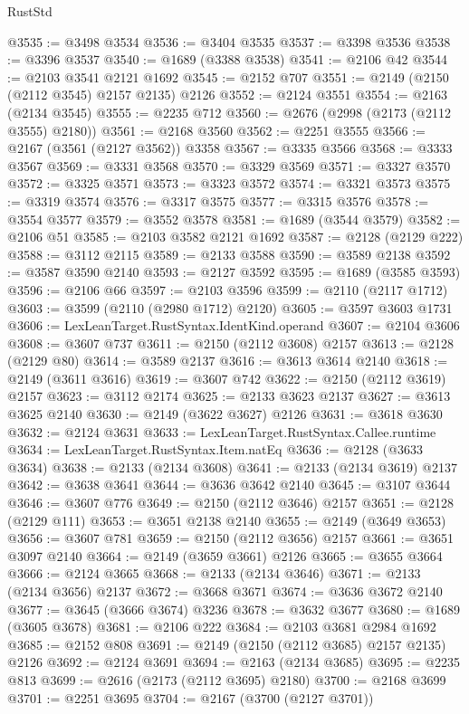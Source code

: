 \begin{lexlean}{RustStd}
\begin{coremodule}
@3535 := @3498 @3534
@3536 := @3404 @3535
@3537 := @3398 @3536
@3538 := @3396 @3537
@3540 := @1689 (@3388 @3538)
@3541 := @2106 @42
@3544 := @2103 @3541 @2121 @1692
@3545 := @2152 @707
@3551 := @2149 (@2150 (@2112 @3545) @2157 @2135) @2126
@3552 := @2124 @3551
@3554 := @2163 (@2134 @3545)
@3555 := @2235 @712
@3560 := @2676 (@2998 (@2173 (@2112 @3555) @2180))
@3561 := @2168 @3560
@3562 := @2251 @3555
@3566 := @2167 (@3561 (@2127 @3562)) @3358
@3567 := @3335 @3566
@3568 := @3333 @3567
@3569 := @3331 @3568
@3570 := @3329 @3569
@3571 := @3327 @3570
@3572 := @3325 @3571
@3573 := @3323 @3572
@3574 := @3321 @3573
@3575 := @3319 @3574
@3576 := @3317 @3575
@3577 := @3315 @3576
@3578 := @3554 @3577
@3579 := @3552 @3578
@3581 := @1689 (@3544 @3579)
@3582 := @2106 @51
@3585 := @2103 @3582 @2121 @1692
@3587 := @2128 (@2129 @222)
@3588 := @3112 @2115
@3589 := @2133 @3588
@3590 := @3589 @2138
@3592 := @3587 @3590 @2140
@3593 := @2127 @3592
@3595 := @1689 (@3585 @3593)
@3596 := @2106 @66
@3597 := @2103 @3596
@3599 := @2110 (@2117 @1712)
@3603 := @3599 (@2110 (@2980 @1712) @2120)
@3605 := @3597 @3603 @1731
@3606 := LexLeanTarget.RustSyntax.IdentKind.operand
@3607 := @2104 @3606
@3608 := @3607 @737
@3611 := @2150 (@2112 @3608) @2157
@3613 := @2128 (@2129 @80)
@3614 := @3589 @2137
@3616 := @3613 @3614 @2140
@3618 := @2149 (@3611 @3616)
@3619 := @3607 @742
@3622 := @2150 (@2112 @3619) @2157
@3623 := @3112 @2174
@3625 := @2133 @3623 @2137
@3627 := @3613 @3625 @2140
@3630 := @2149 (@3622 @3627) @2126
@3631 := @3618 @3630
@3632 := @2124 @3631
@3633 := LexLeanTarget.RustSyntax.Callee.runtime
@3634 := LexLeanTarget.RustSyntax.Item.natEq
@3636 := @2128 (@3633 @3634)
@3638 := @2133 (@2134 @3608)
@3641 := @2133 (@2134 @3619) @2137
@3642 := @3638 @3641
@3644 := @3636 @3642 @2140
@3645 := @3107 @3644
@3646 := @3607 @776
@3649 := @2150 (@2112 @3646) @2157
@3651 := @2128 (@2129 @111)
@3653 := @3651 @2138 @2140
@3655 := @2149 (@3649 @3653)
@3656 := @3607 @781
@3659 := @2150 (@2112 @3656) @2157
@3661 := @3651 @3097 @2140
@3664 := @2149 (@3659 @3661) @2126
@3665 := @3655 @3664
@3666 := @2124 @3665
@3668 := @2133 (@2134 @3646)
@3671 := @2133 (@2134 @3656) @2137
@3672 := @3668 @3671
@3674 := @3636 @3672 @2140
@3677 := @3645 (@3666 @3674) @3236
@3678 := @3632 @3677
@3680 := @1689 (@3605 @3678)
@3681 := @2106 @222
@3684 := @2103 @3681 @2984 @1692
@3685 := @2152 @808
@3691 := @2149 (@2150 (@2112 @3685) @2157 @2135) @2126
@3692 := @2124 @3691
@3694 := @2163 (@2134 @3685)
@3695 := @2235 @813
@3699 := @2616 (@2173 (@2112 @3695) @2180)
@3700 := @2168 @3699
@3701 := @2251 @3695
@3704 := @2167 (@3700 (@2127 @3701))

\end{coremodule}
\end{lexlean}
